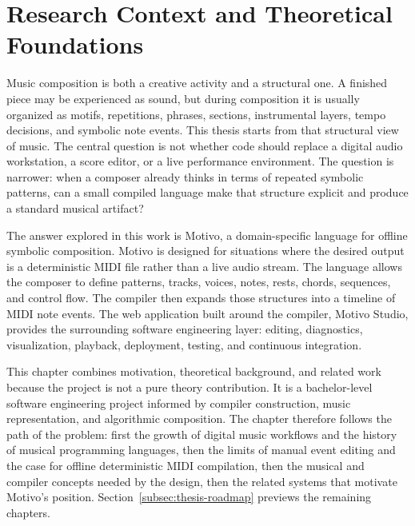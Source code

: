 \chapter{Research Context and Theoretical Foundations}\label{ch:context}

Music composition is both a creative activity and a structural one. A finished piece may be experienced as
sound, but during composition it is usually organized as motifs, repetitions, phrases, sections, instrumental
layers, tempo decisions, and symbolic note events. This thesis starts from that structural view of music. The
central question is not whether code should replace a digital audio workstation, a score editor, or a live
performance environment. The question is narrower: when a composer already thinks in terms of repeated
symbolic patterns, can a small compiled language make that structure explicit and produce a standard musical artifact?

The answer explored in this work is Motivo, a domain-specific language for offline symbolic composition.
Motivo is designed for situations where the desired output is a deterministic MIDI file rather than a live
audio stream. The language allows the composer to define patterns, tracks, voices, notes, rests, chords,
sequences, and control flow. The compiler then expands those structures into a timeline of MIDI note events.
The web application built around the compiler, Motivo Studio, provides the surrounding software engineering
layer: editing, diagnostics, visualization, playback, deployment, testing, and continuous integration.

This chapter combines motivation, theoretical background, and related work because the project is not a pure
theory contribution. It is a bachelor-level software engineering project informed by compiler construction,
music representation, and algorithmic composition. The chapter therefore follows the path of the problem:
first the growth of digital music workflows and the history of musical programming languages, then the limits of
manual event editing and the case for offline deterministic MIDI compilation, then the musical and
compiler concepts needed by the design, then the related systems that motivate Motivo's position.
Section~\ref{subsec:thesis-roadmap} previews the remaining chapters.









